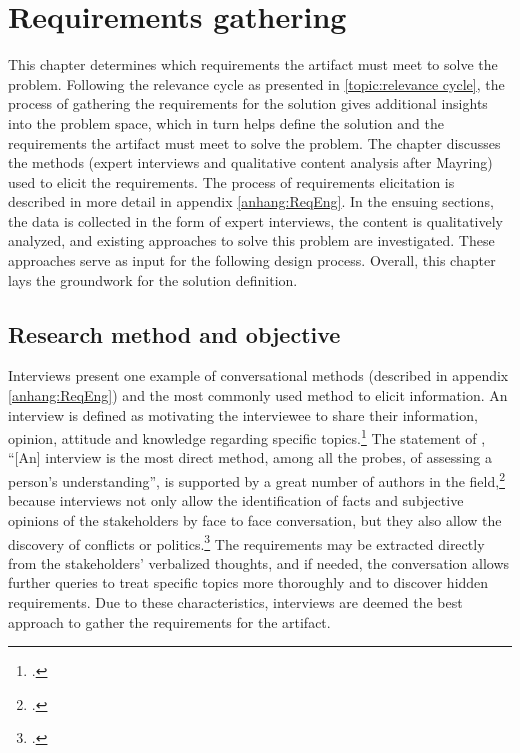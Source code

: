 \chapter{Requirements gathering} \label{chap:ReqEng}

This chapter determines which requirements the artifact must meet to solve the problem. Following the relevance cycle as presented in \ref{topic:relevance cycle}, the process of gathering the requirements for the solution gives additional insights into the problem space, which in turn helps define the solution and the requirements the artifact must meet to solve the problem. The chapter discusses the methods (expert interviews and qualitative content analysis after Mayring) used to elicit the requirements. The process of requirements elicitation is described in more detail in appendix \ref{anhang:ReqEng}. In the ensuing sections, the data is collected in the form of expert interviews, the content is qualitatively analyzed, and existing approaches to solve this problem are investigated. These approaches serve as input for the following design process. Overall, this chapter lays the groundwork for the solution definition.

\section{Research method and objective}
Interviews present one example of conversational methods (described in appendix \ref{anhang:ReqEng}) and the most commonly used method to elicit information. An interview is defined as motivating the interviewee to share their information, opinion, attitude and knowledge regarding specific topics.\footcite[Cf.][p.133]{KrugerqualitativeInhaltsanalyseMethode2004} The statement of \cite{WhiteProbingunderstanding1992}, \enquote{[An] interview is the most direct method, among all the probes, of assessing a person’s understanding}, is supported by a great number of authors in the field,\footcites[Cf.][p.174]{MacaulayRequirementscapturecooperative1993}[cf.][p.105]{SommervilleSoftwareengineering2011}[cf.][p.25]{ZowghiRequirementselicitationsurvey2005}[cf.][p.172]{HickeyElicitationtechniqueselection2003}[cf.][p.227]{ZhangEffectiverequirementsdevelopmentA2007}[cf.][p.92]{MasonQualitativeresearching2002} because interviews not only allow the identification of facts and subjective opinions of the stakeholders by face to face conversation, but they also allow the discovery of conflicts or politics.\footcites[Cf.][p.2]{TiwariMethodologySelectionRequirement2017} The requirements may be extracted directly from the stakeholders' verbalized thoughts, and if needed, the conversation allows further queries to treat specific topics more thoroughly and to discover hidden requirements. Due to these characteristics, interviews are deemed the best approach to gather the requirements for the artifact.

